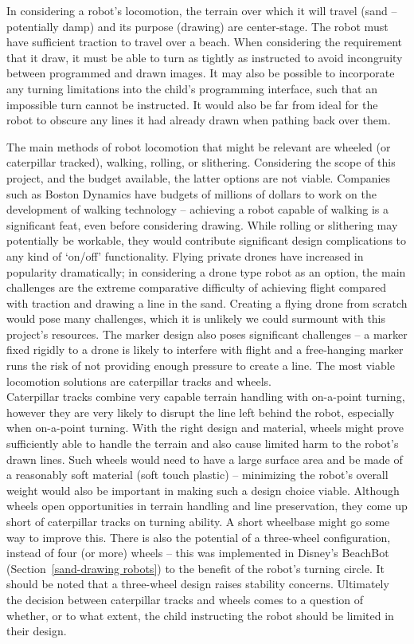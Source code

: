         In considering a robot's locomotion, the terrain over which it will travel (sand -- potentially damp) and its purpose (drawing) are center-stage. The robot must have sufficient traction to travel over a beach. When considering the requirement that it draw, it must be able to turn as tightly as instructed to avoid incongruity between programmed and drawn images. It may also be possible to incorporate any turning limitations into the child's programming interface, such that an impossible turn cannot be instructed. It would also be far from ideal for the robot to obscure any lines it had already drawn when pathing back over them.

        The main methods of robot locomotion that might be relevant are wheeled (or caterpillar tracked), walking, rolling, or slithering. Considering the scope of this project, and the budget available, the latter options are not viable. Companies such as Boston Dynamics have budgets of millions of dollars to work on the development of walking technology -- achieving a robot capable of walking is a significant feat, even before considering drawing. While rolling or slithering may potentially be workable, they would contribute significant design complications to any kind of `on/off' functionality. Flying private drones have increased in popularity dramatically; in considering a drone type robot as an option, the main challenges are the extreme comparative difficulty of achieving flight compared with traction and drawing a line in the sand. Creating a flying drone from scratch would pose many challenges, which it is unlikely we could surmount with this project's resources. The marker design also poses significant challenges -- a marker fixed rigidly to a drone is likely to interfere with flight and a free-hanging marker runs the risk of not providing enough pressure to create a line. The most viable locomotion solutions are caterpillar tracks and wheels.\\
        Caterpillar tracks combine very capable terrain handling with on-a-point turning, however they are very likely to disrupt the line left behind the robot, especially when on-a-point turning.  With the right design and material, wheels might prove sufficiently able to handle the terrain and also cause limited harm to the robot's drawn lines. Such wheels would need to have a large surface area and be made of a reasonably soft material (\eg soft touch plastic) -- minimizing the robot's overall weight would also be important in making such a design choice viable. Although wheels open opportunities in terrain handling and line preservation, they come up short of caterpillar tracks on turning ability. A short wheelbase might go some way to improve this. There is also the potential of a three-wheel configuration, instead of four (or more) wheels -- this was implemented in Disney's BeachBot (Section~\ref{sand-drawing robots}) to the benefit of the robot’s turning circle. It should be noted that a three-wheel design raises stability concerns. Ultimately the decision between caterpillar tracks and wheels comes to a question of whether, or to what extent, the child instructing the robot should be limited in their design.


